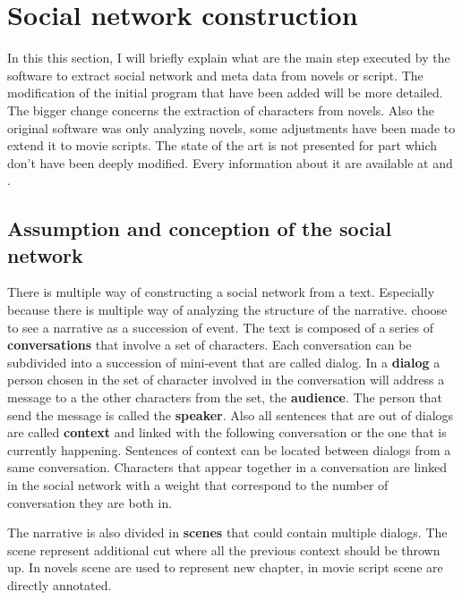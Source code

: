 \documentclass[a4paper, 12pt]{report}
\begin{document}
\chapter{Social network construction}

In this this section, I will briefly explain what are the main step executed by the software to extract social network and meta data from novels or script. The modification of the initial program that have been added will be more detailed. The bigger change concerns the extraction of characters from novels. Also the original software was only analyzing novels, some adjustments have been made to extend it to movie scripts. The state of the art is not presented for part which don't have been deeply modified. Every information about it are available at \cite{original} and \cite{original_thesis}. 

\section{Assumption and conception of the social network}
There is multiple way of constructing a social network from a text. Especially because there is multiple way of analyzing the structure of the narrative. \cite{original} choose to see a narrative as a succession of event. The text is composed of a series of \textbf{conversations} that involve a set of characters. Each conversation can be subdivided into a succession of mini-event that are called dialog. In a \textbf{dialog} a person chosen in the set of character involved in the conversation will address a message to a the other characters from the set, the \textbf{audience}. The person that send the message is called the \textbf{speaker}. Also all sentences that are out of dialogs are called \textbf{context} and linked with the following conversation or the one that is currently happening. Sentences of context can be located between dialogs from a same conversation. Characters that appear together in a conversation are linked in the social network with a weight that correspond to the number of conversation they are both in. 

The narrative is also divided in \textbf{scenes} that could contain multiple dialogs. The scene represent additional cut where all the previous context should be thrown up. In novels scene are used to represent new chapter, in movie script scene are directly annotated.
\end{document}

